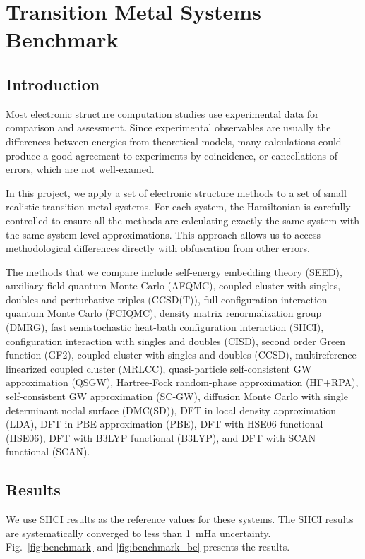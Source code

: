 \chapter{Transition Metal Systems Benchmark}
\label{ch:benchmark}
\section{Introduction}
Most electronic structure computation studies use experimental data for comparison and assessment.
Since experimental observables are usually the differences between energies from theoretical models, many calculations could produce a good agreement to experiments by coincidence, or cancellations of errors, which are not well-examed.

In this project, we apply a set of electronic structure methods to a set of small realistic transition metal systems.
For each system, the Hamiltonian is carefully controlled to ensure all the methods are calculating exactly the same system with the same system-level approximations.
This approach allows us to access methodological differences directly with obfuscation from other errors.

The methods that we compare include self-energy embedding theory (SEED), auxiliary field quantum Monte Carlo (AFQMC), coupled cluster with singles, doubles and perturbative triples (CCSD(T)), full configuration interaction quantum Monte Carlo (FCIQMC), density matrix renormalization group (DMRG), fast semistochastic heat-bath configuration interaction (SHCI), configuration interaction with singles and doubles (CISD), second order Green function (GF2), coupled cluster with singles and doubles (CCSD), multireference linearized coupled cluster (MRLCC), quasi-particle self-consistent GW approximation (QSGW), Hartree-Fock random-phase approximation (HF+RPA),  self-consistent GW approximation (SC-GW), diffusion Monte Carlo with single determinant nodal surface (DMC(SD)), DFT in local density approximation (LDA), DFT in PBE approximation (PBE), DFT with HSE06 functional (HSE06), DFT with B3LYP functional (B3LYP), and DFT with SCAN functional (SCAN).

\section{Results}

We use SHCI results as the reference values for these systems.
The SHCI results are systematically converged to less than 1~mHa uncertainty.
Fig.~\ref{fig:benchmark} and \ref{fig:benchmark_be} presents the results.

